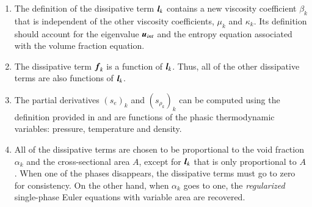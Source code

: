 \begin{enumerate}
\item {The definition of the dissipative term $\boldsymbol l_k$ contains a new viscosity
    coefficient $\beta_k$ that is independent of
    the other viscosity coefficients, $\mu_k$ and $\kappa_k$. Its definition should
    account for the eigenvalue $\boldsymbol u_{int}$ and  the entropy equation associated with the volume fraction equation.}

\item {The dissipative term $\boldsymbol f_k$ is a function of $\boldsymbol l_k$. Thus, all of the other
    dissipative terms are also functions of $\boldsymbol l_k$.}

\item {The partial derivatives $(s_e)_k$ and $(s_{\rho_k})_k$ can be computed using the
    definition provided in  and are functions of the phasic thermodynamic
    variables: pressure, temperature and density.}

\item {All of the dissipative terms are chosen to be proportional to the void
    fraction $\alpha_k$ and the cross-sectional area $A$, except for $\boldsymbol l_k$ that is only proportional to $A$. 
When one of the phases disappears, the dissipative terms
    must go to zero for consistency. On the other hand, when $\alpha_k$ goes to one,
    the \emph{regularized} single-phase Euler equations with variable area are recovered. %
		}    


\end{enumerate}
